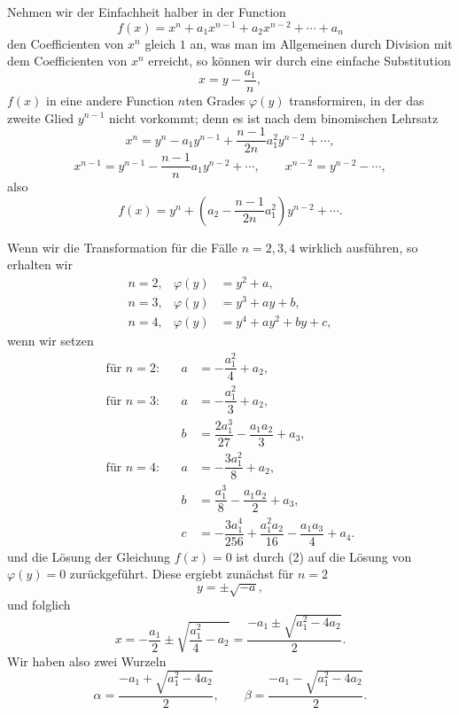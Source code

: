 \documentclass[11pt]{article}
\begin{document}
Nehmen wir der Einfachheit halber in der Function
\begin{equation}
f(x)=x^n+a_1x^{n-1}+a_2x^{n-2}+\cdots+a_n
\tag{1}
\end{equation}
den Coefficienten von $x^n$ gleich $1$ an, was man im Allgemeinen durch Division mit dem Coefficienten von $x^n$ erreicht, so können wir durch eine einfache Substitution
\begin{equation}
x=y-\frac{a_1}{n},
\tag{2}
\end{equation}
$f(x)$ in eine andere Function $n$ten Grades $\varphi(y)$ transformiren, in der das zweite Glied $y^{n-1}$ nicht vorkommt; denn es ist nach dem binomischen Lehrsatz
\[
 x^n=y^n-a_1y^{n-1}+\frac{n-1}{2n}a_1^2y^{n-2}+\cdots,
\]
\[
 x^{n-1}=y^{n-1}-\frac{n-1}{n}a_1y^{n-2}+\cdots,
 \qquad x^{n-2}=y^{n-2}-\cdots,
\]
also
\[
 f(x)=y^n+\left(a_2-\frac{n-1}{2n}a_1^2\right)y^{n-2}+\cdots.
\]

Wenn wir die Transformation für die Fälle $n=2,3,4$ wirklich ausführen, so erhalten wir
\begin{equation}
\begin{array}{rcl}
n=2, & \varphi(y)&=y^2+a,\\[0.25em]
n=3, & \varphi(y)&=y^3+ay+b,\\[0.25em]
n=4, & \varphi(y)&=y^4+ay^2+by+c,
\end{array}
\tag{3}
\end{equation}
wenn wir setzen
\begin{equation}
\begin{array}{rcll}
\text{für }n=2:&& a&=-\dfrac{a_1^2}{4}+a_2,\\[0.75em]
\text{für }n=3:&& a&=-\dfrac{a_1^2}{3}+a_2,\\[0.75em]
&& b&=\dfrac{2a_1^3}{27}-\dfrac{a_1a_2}{3}+a_3,\\[0.75em]
\text{für }n=4:&& a&=-\dfrac{3a_1^2}{8}+a_2,\\[0.75em]
&& b&=\dfrac{a_1^3}{8}-\dfrac{a_1a_2}{2}+a_3,\\[0.75em]
&& c&=-\dfrac{3a_1^4}{256}+\dfrac{a_1^2a_2}{16}-\dfrac{a_1a_3}{4}+a_4.
\end{array}
\tag{4}
\end{equation}
und die Lösung der Gleichung $f(x)=0$ ist durch (2) auf die Lösung von $\varphi(y)=0$ zurückgeführt. Diese ergiebt zunächst für $n=2$
\[
 y=\pm\sqrt{-a},
\]
und folglich
\[
 x=-\frac{a_1}{2}\pm\sqrt{\frac{a_1^2}{4}-a_2}
   =\frac{-a_1\pm\sqrt{a_1^2-4a_2}}{2}.
\]
Wir haben also zwei Wurzeln
\begin{equation}
\alpha=\frac{-a_1+\sqrt{a_1^2-4a_2}}{2},\qquad
\beta =\frac{-a_1-\sqrt{a_1^2-4a_2}}{2}.
\tag{5}
\end{equation}
\end{document}
